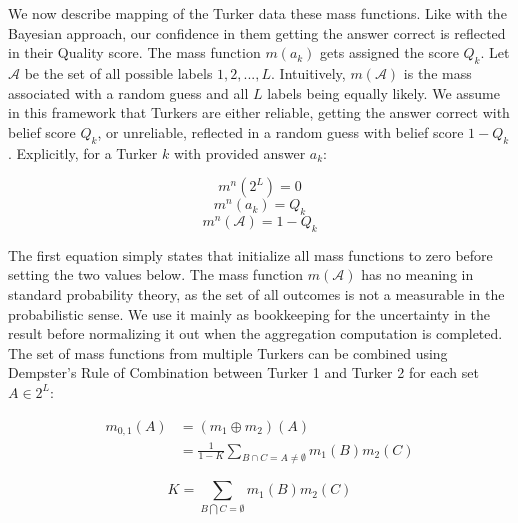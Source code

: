 
We now describe mapping of the Turker data these mass functions.  Like with the Bayesian approach, our confidence in them getting the answer correct is reflected in their Quality score.  The mass function $m(a_{k})$ gets assigned the score $Q_{k}$.  Let $\mathcal{A}$ be the set of all possible labels ${1,2,...,L}$.  Intuitively, $m(\mathcal{A})$ is the mass associated with a random guess and all $L$ labels being equally likely.  We assume in this framework that Turkers are either reliable, getting the answer correct with belief score $Q_{k}$, or unreliable, reflected in a random guess with belief score $1-Q_{k}$.  Explicitly, for a Turker $k$ with provided answer $a_{k}$:

\begin{equation}
m^{n}(2^{L}) = 0
\end{equation}
\begin{equation}
\label{eq:mass1}
m^{n}(a_{k}) = Q_{k}
\end{equation}
\begin{equation}
\label{eq:mass2}
m^{n}(\mathcal{A}) = 1-Q_{k}
\end{equation}

The first equation simply states that initialize all mass functions to zero before setting the two values below.  The mass function $m(\mathcal{A})$ has no meaning in standard probability theory, as the set of all outcomes is not a measurable in the probabilistic sense.  We use it mainly as bookkeeping for the uncertainty in the result before normalizing it out when the aggregation computation is completed.  The set of mass functions from multiple Turkers can be combined using Dempster's Rule of Combination between Turker 1 and Turker 2 for each set $A\in2^{L}$:

\begin{equation}
\begin{split}
\label{eq:DS_combo}
m_{0,1}(A) &=(m_{1}\oplus m_{2})(A)\\
                   &=\frac{1}{1-K} \sum_{B\cap C=A\neq\emptyset} m_{1}(B)m_{2}(C)
\end{split}
\end{equation}

\begin{equation}
K=\sum_{B\bigcap C=\emptyset}m_{1}(B)m_{2}(C)
\end{equation}

